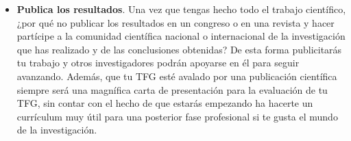 \begin{itemize}
    \item \textbf{Publica los resultados}. Una vez que tengas hecho todo el trabajo científico, ¿por qué no publicar los resultados en un congreso o en una revista y hacer partícipe a la comunidad científica nacional o internacional de la investigación que has realizado y de las conclusiones obtenidas? De esta forma publicitarás tu trabajo y otros investigadores podrán apoyarse en él para seguir avanzando. Además, que tu TFG esté avalado por una publicación científica siempre será una magnífica carta de presentación para la evaluación de tu TFG, sin contar con el hecho de que estarás empezando ha hacerte un currículum muy útil para una posterior fase profesional si te gusta el mundo de la investigación.
\end{itemize}

